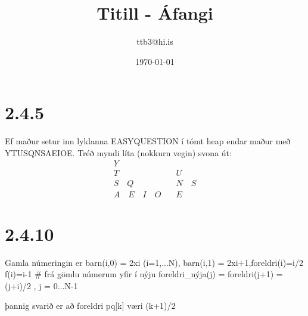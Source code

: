 \documentclass{article}
\title{Titill - Áfangi}
\author{ttb3@hi.is}
\date{\today}
\begin{document}
\maketitle 

\section*{2.4.5}
Ef maður setur inn lyklanna EASYQUESTION í tómt heap endar maður með YTUSQNSAEIOE. Tréð myndi líta (nokkurn vegin) svona út:
\begin{align}
    Y&\\
    T\quad&U\\
    S\quad Q\quad &N\quad S\\
    A\quad E\quad I\quad O\quad& E
\end{align}

\section*{2.4.10}

Gamla númeringin er barn(i,0) = 2xi (i=1,...N), barn(i,1) = 2xi+1,foreldri(i)=i/2
f(i)=i-1 # frá gömlu númerum yfir í nýju
foreldri_nýja(j) = foreldri(j+1) = (j+i)/2  , j = 0...N-1

þannig svarið er að foreldri pq[k] væri (k+1)/2
\end{document}
